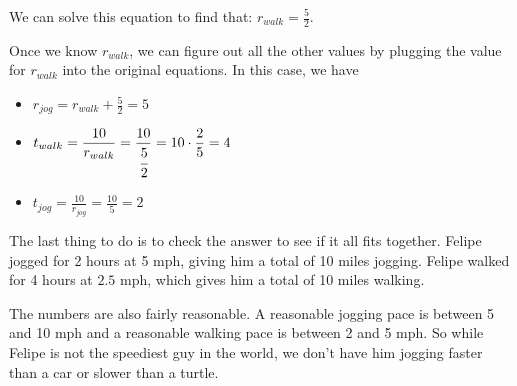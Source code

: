 \documentclass[fleqn,addpoints]{exam}
\begin{document}
We can solve this equation to find that: $\displaystyle r_{walk} = \frac{5}{2}$.

Once we know $r_{walk}$, we can figure out all the other values by plugging the value for $r_{walk}$ into the original
equations.  In this case, we have 
\begin{itemize}
  \item $\displaystyle r_{jog} = r_{walk} + \frac{5}{2} = 5$
  \item $ \displaystyle t_{walk} = \frac{10}{r_{walk}} = \frac{10}{\cfrac{5}{2}} = 10 \cdot \frac{2}{5} = 4$
  \item $ \displaystyle t_{jog} = \frac{10}{r_{jog}} = \frac{10}{5} = 2$
\end{itemize}

The last thing to do is to check the answer to see if it all fits together.  Felipe jogged for 2 hours at 5 mph, giving
him a total of 10 miles jogging.  Felipe walked for 4 hours at $2.5$ mph, which gives him a total of 10 miles
walking.

The numbers are also fairly reasonable.  A reasonable jogging pace is between 5 and 10 mph and a reasonable walking pace
is between 2 and 5 mph.  So while Felipe is not the speediest guy in the world, we don't have him jogging faster than a car
or slower than a turtle.
\end{document}
